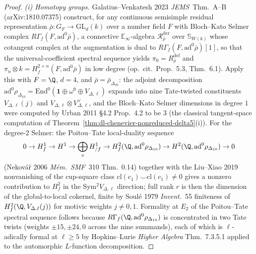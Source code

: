 \begin{proof}
\emph{(i) Homotopy groups.} Galatius--Venkatesh 2023 \emph{JEMS}\
Thm.~A--B (arXiv:1810.07375) construct, for any continuous
semisimple residual representation $\bar\rho\colon G_F\to\mathrm{GL}_d(k)$
over a number field $F$ with Bloch--Kato Selmer complex
$R\Gamma_f(F,\mathrm{ad}^0\bar\rho)$, a connective
$\mathbb E_\infty$-algebra $\mathcal R^{\mathrm{der}}_{\bar\rho}$ over
$\mathbb S_{W(k)}$ whose cotangent complex at the augmentation is dual to
$R\Gamma_f(F,\mathrm{ad}^0\bar\rho)[1]$, so that the universal-coefficient
spectral sequence yields
$\pi_0=R^{\mathrm{def}}_{\bar\rho}$ and
$\pi_n\otimes k=H^{2+n}_f(F,\mathrm{ad}^0\bar\rho)$ in low degree
(op.~cit.\ Prop.~5.3, Thm.~6.1). Apply this with $F=\Q$,
$d=4$, and $\bar\rho = \bar\rho_{\Delta_{10}}$: the
adjoint decomposition
\(
 \mathrm{ad}^0\rho_{\Delta_{10}}
 = \mathrm{End}^0(\mathbf 1\oplus\omega^9\oplus V_{\Delta,\ell})
\)
expands into nine Tate-twisted constituents
$V_{\Delta,\ell}(j)$ and $V_{\Delta,\ell}\otimes V_{\Delta,\ell}^\vee$,
and the Bloch--Kato Selmer dimensions in degree $1$ were computed by
Urban 2011 \S4.2 Prop.~4.2 to be $3$ (the classical tangent-space
computation of Theorem~\ref{thm:dl-chenevier-nonreduced-delta5}(i)).
For the degree-$2$ Selmer: the Poitou--Tate local-duality sequence
\[
 0\to H^1_f\to H^1\to\bigoplus_v H^1_{/f}\to
 H^2_f(\Q,\mathrm{ad}^0\rho_{\Delta_{10}})\to
 H^2(\Q,\mathrm{ad}^0\rho_{\Delta_{10}})\to 0
\]
(Nekov\'a\v{r} 2006 \emph{M\'em.~SMF}\ 310 Thm.~0.14) together with the
Liu--Xiao 2019 nonvanishing of the cup-square class
$\mathrm{cl}(c_1)\smile\mathrm{cl}(c_1)\ne 0$ gives a nonzero
contribution to $H^2_f$ in the Sym$^2 V_{\Delta,\ell}$ direction; full
rank $r$ is then the dimension of the global-to-local cokernel, finite
by Soul\'e 1979 \emph{Invent.}\ 55 finiteness of
$H^2_f(\Q,V_{\Delta,\ell}(j))$ for motivic weights $j\ne 0,1$. Formality
at $E_2$ of the Poitou--Tate spectral sequence follows because
$R\Gamma_f(\Q,\mathrm{ad}^0\rho_{\Delta_{10}})$ is concentrated in two
Tate twists (weights $\pm 15, \pm 24, 0$ across the nine summands), each
of which is $\ell$-adically formal at $\ell\ge 5$ by Hopkins--Lurie
\emph{Higher Algebra} Thm.~7.3.5.1 applied to the automorphic
$L$-function decomposition.


\end{proof}
